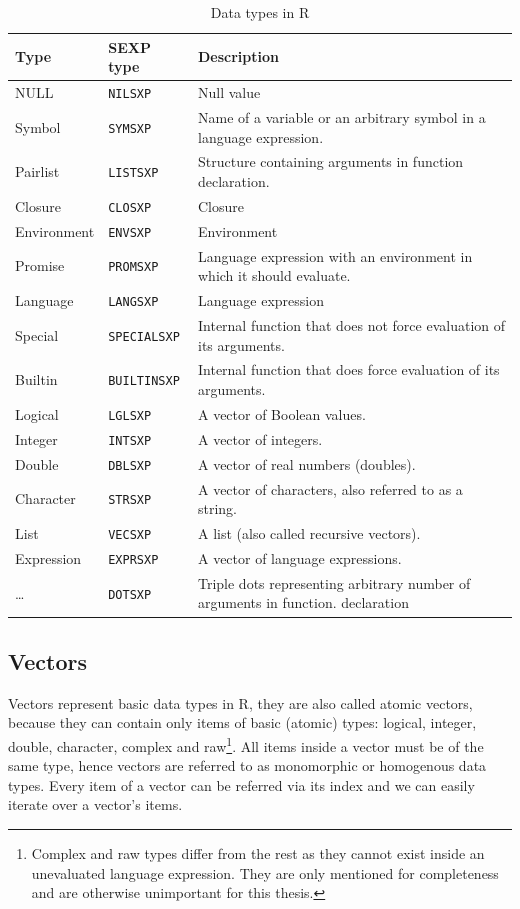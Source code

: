\documentclass[thesis=B,english]{FITthesis}[2012/10/20]
\begin{document}
\begin{table}
	\caption[Data types in R]{Data types in R}\label{tab:types}
	\begin{tabularx}{1\textwidth}{|l|l|X|}\hline
		Type		& SEXP type		& Description \tabularnewline \hline \hline
		NULL		& \verb|NILSXP|		& Null value  \tabularnewline \hline
		Symbol	& \verb|SYMSXP|	& Name of a variable or an arbitrary symbol in a language expression.  \tabularnewline \hline
		Pairlist	& \verb|LISTSXP|	& Structure containing arguments in function declaration. \tabularnewline \hline
		Closure	& \verb|CLOSXP|	& Closure  \tabularnewline \hline
		Environment	& \verb|ENVSXP|	& Environment  \tabularnewline \hline
		Promise	& \verb|PROMSXP|	& Language expression with an environment in which it should evaluate. \tabularnewline \hline
		Language	& \verb|LANGSXP|	& Language expression  \tabularnewline \hline
		Special	& \verb|SPECIALSXP|	& Internal function that does not force evaluation of its arguments. \tabularnewline \hline
		Builtin	& \verb|BUILTINSXP|	& Internal function that does force evaluation of its arguments. \tabularnewline \hline
		Logical	& \verb|LGLSXP|	& A vector of Boolean values. \tabularnewline \hline
		Integer	& \verb|INTSXP|	& A vector of integers.  \tabularnewline \hline
		Double	& \verb|DBLSXP|	& A vector of real numbers (doubles).  \tabularnewline \hline
		Character & \verb|STRSXP| & A vector of characters, also referred to as a string. \tabularnewline \hline
		List	& \verb|VECSXP|	& A list (also called recursive vectors).  \tabularnewline \hline
		Expression	& \verb|EXPRSXP|	& A vector of language expressions.  \tabularnewline \hline
		\ldots	& \verb|DOTSXP|	& Triple dots representing arbitrary number of arguments in function. declaration  \tabularnewline \hline		
	\end{tabularx}
\end{table}

\subsection{Vectors}
Vectors represent basic data types in R, they are also called atomic vectors, because they can contain only items of basic (atomic) types: logical, integer, double, character, complex and raw\footnote{Complex and raw types differ from the rest as they cannot exist inside an unevaluated language expression. They are only mentioned for completeness and are otherwise unimportant for this thesis.}. All items inside a vector must be of the same type, hence vectors are referred to as monomorphic or homogenous data types. Every item of a vector can be referred via its index and we can easily iterate over a vector’s items.
\end{document}

